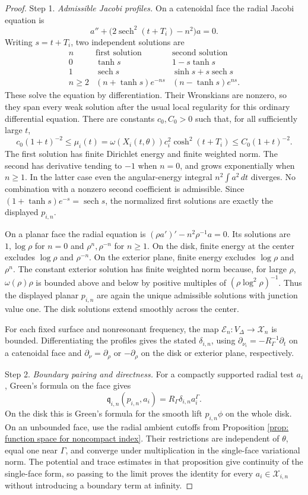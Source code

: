 \documentclass[11pt,twoside]{amsart}
\numberwithin{equation}{section}
\begin{document}
\begin{proof}
\noindent Step 1. \emph{Admissible Jacobi profiles.}
On a catenoidal face the radial Jacobi equation is
\[
a''+\bigl(2\operatorname{sech}^2(t+T_i)-n^2\bigr)a=0.
\]
Writing $s=t+T_i$, two independent solutions are
\[
\begin{array}{c|c|c}
n&\text{first solution}&\text{second solution}\\ \hline
0&\tanh s&1-s\tanh s\\
1&\operatorname{sech}s&\sinh s+s\operatorname{sech}s\\
n\geq2&(n+\tanh s)e^{-ns}&(n-\tanh s)e^{ns}.
\end{array}
\]
These solve the equation by differentiation. Their Wronskians are nonzero, so they span every weak solution after the usual local regularity for this ordinary differential equation. There are constants $c_0,C_0>0$ such that, for all sufficiently large $t$,
\[
c_0(1+t)^{-2}\le \mu_i(t)=\omega(X_i(t,\theta))c_i^2\cosh^2(t+T_i)\le C_0(1+t)^{-2}.
\]
The first solution has finite Dirichlet energy and finite weighted norm. The second has derivative tending to $-1$ when $n=0$, and grows exponentially when $n\geq1$. In the latter case even the angular-energy integral $n^2\int a^2\,dt$ diverges. No combination with a nonzero second coefficient is admissible. Since $(1+\tanh s)e^{-s}=\operatorname{sech}s$, the normalized first solutions are exactly the displayed $p_{i,n}$.

On a planar face the radial equation is
$(\rho a')'-n^2\rho^{-1}a=0$. Its solutions are $1,\log\rho$ for $n=0$ and $\rho^n,\rho^{-n}$ for $n\geq1$. On the disk, finite energy at the center excludes $\log\rho$ and $\rho^{-n}$. On the exterior plane, finite energy excludes $\log\rho$ and $\rho^n$. The constant exterior solution has finite weighted norm because, for large $\rho$, $\omega(\rho)\rho$ is bounded above and below by positive multiples of $(\rho\log^2\rho)^{-1}$. Thus the displayed planar $p_{i,n}$ are again the unique admissible solutions with junction value one. The disk solutions extend smoothly across the center.

For each fixed surface and nonresonant frequency, the map $\mathscr E_n:V_\Delta\to\mathcal X_n$ is bounded. Differentiating the profiles gives the stated $\delta_{i,n}$, using $\partial_{\nu_i}=-R_\Gamma^{-1}\partial_t$ on a catenoidal face and $\partial_\nu=\partial_\rho$ or $-\partial_\rho$ on the disk or exterior plane, respectively.

\medskip
\noindent Step 2. \emph{Boundary pairing and directness.}
For a compactly supported radial test $a_i$, Green's formula on the face gives
\[
\mathfrak q_{i,n}(p_{i,n},a_i)
=R_\Gamma\delta_{i,n}a_i^\Gamma.
\]
On the disk this is Green's formula for the smooth lift $p_{i,n}\phi$ on the whole disk. On an unbounded face, use the radial ambient cutoffs from Proposition \ref{prop: function space for noncompact index}. Their restrictions are independent of $\theta$, equal one near $\Gamma$, and converge under multiplication in the single-face variational norm. The potential and trace estimates in that proposition give continuity of the single-face form, so passing to the limit proves the identity for every $a_i\in\mathcal X_{i,n}$ without introducing a boundary term at infinity.


\end{proof}
\end{document}
